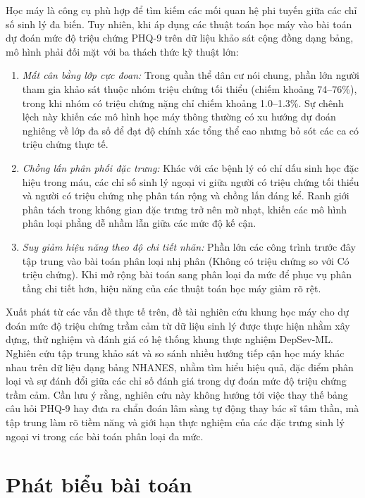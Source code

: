 Học máy là công cụ phù hợp để tìm kiếm các mối quan hệ phi tuyến giữa các chỉ số sinh lý đa biến. Tuy nhiên, khi áp dụng các thuật toán học máy vào bài toán dự đoán mức độ triệu chứng PHQ-9 trên dữ liệu khảo sát cộng đồng dạng bảng, mô hình phải đối mặt với ba thách thức kỹ thuật lớn:
\begin{enumerate}
    \item \textit{Mất cân bằng lớp cực đoan:} Trong quần thể dân cư nói chung, phần lớn người tham gia khảo sát thuộc nhóm triệu chứng tối thiểu (chiếm khoảng 74--76\%), trong khi nhóm có triệu chứng nặng chỉ chiếm khoảng 1.0--1.3\%. Sự chênh lệch này khiến các mô hình học máy thông thường có xu hướng dự đoán nghiêng về lớp đa số để đạt độ chính xác tổng thể cao nhưng bỏ sót các ca có triệu chứng thực tế.
    \item \textit{Chồng lấn phân phối đặc trưng:} Khác với các bệnh lý có chỉ dấu sinh học đặc hiệu trong máu, các chỉ số sinh lý ngoại vi giữa người có triệu chứng tối thiểu và người có triệu chứng nhẹ phân tán rộng và chồng lấn đáng kể. Ranh giới phân tách trong không gian đặc trưng trở nên mờ nhạt, khiến các mô hình phân loại phẳng dễ nhầm lẫn giữa các mức độ kế cận.
    \item \textit{Suy giảm hiệu năng theo độ chi tiết nhãn:} Phần lớn các công trình trước đây tập trung vào bài toán phân loại nhị phân (Không có triệu chứng so với Có triệu chứng). Khi mở rộng bài toán sang phân loại đa mức để phục vụ phân tầng chi tiết hơn, hiệu năng của các thuật toán học máy giảm rõ rệt.
\end{enumerate}

Xuất phát từ các vấn đề thực tế trên, đề tài nghiên cứu khung học máy cho dự đoán mức độ triệu chứng trầm cảm từ dữ liệu sinh lý được thực hiện nhằm xây dựng, thử nghiệm và đánh giá có hệ thống khung thực nghiệm DepSev-ML. Nghiên cứu tập trung khảo sát và so sánh nhiều hướng tiếp cận học máy khác nhau trên dữ liệu dạng bảng NHANES, nhằm tìm hiểu hiệu quả, đặc điểm phân loại và sự đánh đổi giữa các chỉ số đánh giá trong dự đoán mức độ triệu chứng trầm cảm. Cần lưu ý rằng, nghiên cứu này không hướng tới việc thay thế bảng câu hỏi PHQ-9 hay đưa ra chẩn đoán lâm sàng tự động thay bác sĩ tâm thần, mà tập trung làm rõ tiềm năng và giới hạn thực nghiệm của các đặc trưng sinh lý ngoại vi trong các bài toán phân loại đa mức.

\section{Phát biểu bài toán}
\label{sec:phat-bieu-bai-toan}

